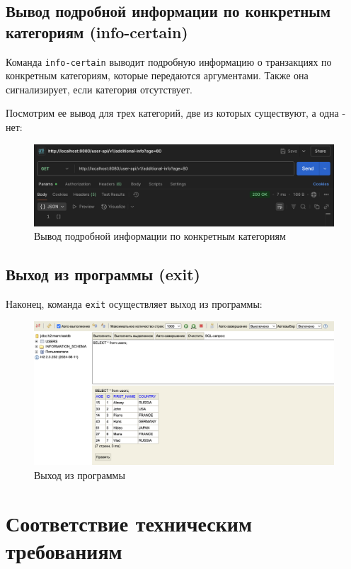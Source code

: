 \documentclass[a4paper, 14pt]{article}
\begin{document}
\subsection{Вывод подробной информации по конкретным категориям (info-certain)}

Команда \texttt{info-certain} выводит подробную информацию о транзакциях по конкретным категориям, которые передаются аргументами. Также она сигнализирует, если категория отсутствует.

Посмотрим ее вывод для трех категорий, две из которых существуют, а одна - нет:

\begin{figure}[H]
	\centering
	\includegraphics[width=13cm]{resources/13.png}
	\caption{Вывод подробной информации по конкретным категориям}
\end{figure}

\subsection{Выход из программы (exit)}

Наконец, команда \texttt{exit} осуществляет выход из программы:

\begin{figure}[H]
	\centering
	\includegraphics[width=13cm]{resources/14.png}
	\caption{Выход из программы}
\end{figure}

\newpage
\section{Соответствие техническим требованиям}
\end{document}
